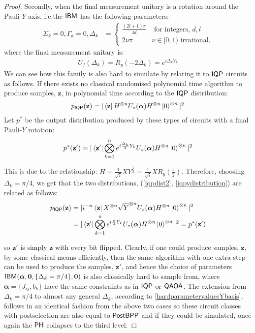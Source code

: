 \begin{proof}
Secondly, when the final measurement unitary is a rotation around the Pauli-$Y$ axis, i.e.\@ the $\textsf{IBM}$ has the following parameters:
\begin{align}
        \Sigma_k = 0, \Gamma_k = 0, \Delta_k &=  
        \begin{cases}
            \frac{(2l+1)\pi}{4d} &\text{ for integers, } d, l\\
            2\nu \pi& \nu \in[0,1) \text{ irrational.}
        \end{cases}\label{hardparametervaluesYbasis}
\end{align}
where the final measurement unitary is:
\begin{align}
U_f(\Delta_k) = R_y(-2\Delta_{k}) =  e^{i\Delta_{k} Y_k} \label{yrotation}
\end{align}
We can see how this family is also hard to simulate by relating it to $\operatorname{\textsf{IQP}}$ circuits as follows. If there exists no classical randomised polynomial time algorithm to produce samples, $\mathbf{z}$, in polynomial time according to the $\operatorname{\textsf{IQP}}$ distribution:
\begin{align}
p_{\operatorname{\textsf{IQP}}}(\mathbf{z}) = |\bra{\mathbf{z}}H^{\otimes n}U_z(\boldsymbol\alpha) H^{\otimes n}\ket{0}^{\otimes n}|^2 \label{iqpdist2}
\end{align}
Let $p^*$ be the output distribution produced by these types of circuits with a final Pauli-$Y$ rotation:
\begin{align}
p^*(\mathbf{z}') = |\bra{\mathbf{z}'}\bigotimes\limits_{k=1}^n e^{i\frac{\Delta_k}{2} Y_k}U_z(\boldsymbol\alpha) H^{\otimes n}\ket{0}^{\otimes n}|^2 \label{iqpydistribution}
\end{align}

This is due to the relationship: $H  =\frac{1}{\sqrt{i}}XY^{\frac{1}{2}} = \frac{1}{\sqrt{i}}XR_y(\frac{\pi}{2})$. Therefore, choosing $\Delta_k = \pi/4$, we get that the two distributions, (\eqref{iqpdist2}, \eqref{iqpydistribution}) are related as follows:
\begin{align}
p_{\operatorname{\textsf{IQP}}}(\mathbf{z}) &= |i^{-n}\bra{\mathbf{z}}X^{\otimes n}\sqrt{Y}^{\otimes n}U_z(\boldsymbol\alpha) H^{\otimes n}\ket{0}^{\otimes n}|^2\\
&= |\bra{\mathbf{z}'}\bigotimes\limits_{k=1}^ne^{i\frac{\pi}{4} Y_k}U_z(\boldsymbol\alpha) H^{\otimes n}\ket{0}^{\otimes n}|^2  = p^*(\mathbf{z}')
\end{align}

so $\mathbf{z}'$ is simply $\mathbf{z}$ with every bit flipped. Clearly, if one could produce samples, $\mathbf{z}$, by some classical means efficiently, then the same algorithm with one extra step can be used to produce the samples, $\mathbf{z}'$, and hence the choice of parameters $\textsf{IBM}(\boldsymbol\alpha, \mathbf{0}, \{\Delta_k = \pi/4\},\mathbf{0})$ is also classically hard to sample from, where $\boldsymbol\alpha = \{ J_{ij}, b_{k}\}$ have the same constraints as in $\operatorname{\textsf{IQP}}$ or $\operatorname{\textsf{QAOA}}$. The extension from $\Delta_k = \pi/4$ to almost any general $\Delta_k$, according to \eqref{hardparametervaluesYbasis}, follows in an identical fashion from the above two cases so these circuit classes with postselection are also equal to $\operatorname{\textsf{PostBPP}}$ and if they could be simulated, once again the $\operatorname{\textsf{PH}}$ collapses to the third level.


\end{proof}
